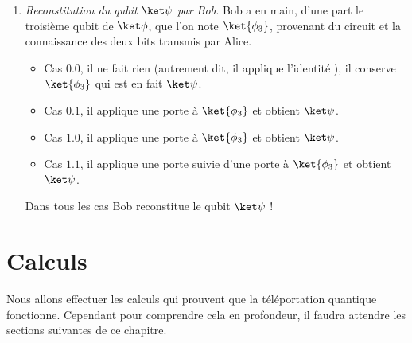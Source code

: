 \documentclass[11pt,class=report,crop=false]{standalone}
\begin{document}
\begin{enumerate}
  \item \emph{Reconstitution du qubit $\ket\psi$ par Bob.}
Bob a en main, d'une part le troisième qubit de $\ket\phi$, que l'on note $\ket{\phi_3}$,  provenant du circuit et la connaissance des deux bits transmis par Alice.
\begin{itemize}
  \item Cas $0.0$, il ne fait rien (autrement dit, il applique l'identité ), il conserve $\ket{\phi_3}$ qui est en fait $\ket\psi$.
  \item Cas $0.1$, il applique une porte  à $\ket{\phi_3}$ et obtient $\ket\psi$.
  \item Cas $1.0$, il applique une porte  à $\ket{\phi_3}$ et obtient $\ket\psi$.
  \item Cas $1.1$, il applique une porte  suivie d'une porte  à $\ket{\phi_3}$ et obtient $\ket\psi$.
\end{itemize}
Dans tous les cas Bob reconstitue le qubit $\ket\psi$ !

\end{enumerate}


\section{Calculs}
\label{sec:calculs}

Nous allons effectuer les calculs qui prouvent que la téléportation quantique fonctionne. Cependant pour comprendre cela en profondeur, il faudra attendre les sections suivantes de ce chapitre.
\end{document}
